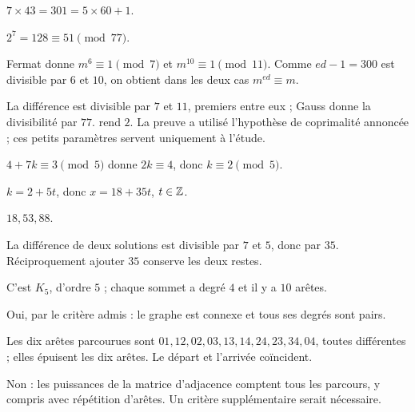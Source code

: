 \par\addvspace{6mm}\label{projet-cor-4}
\begin{questions}
\item $7\times43=301=5\times60+1$.
\item $2^7=128\equiv51\pmod{77}$.
\item Fermat donne $m^6\equiv1\pmod7$ et $m^{10}\equiv1\pmod{11}$. Comme $ed-1=300$ est divisible par $6$ et $10$, on obtient dans les deux cas $m^{ed}\equiv m$.
\item La différence est divisible par $7$ et $11$, premiers entre eux ; Gauss donne la divisibilité par $77$.  rend $2$. La preuve a utilisé l’hypothèse de coprimalité annoncée ; ces petits paramètres servent uniquement à l’étude.
\end{questions}
\par\addvspace{6mm}\label{projet-cor-5}
\begin{questions}
\item $4+7k\equiv3\pmod5$ donne $2k\equiv4$, donc $k\equiv2\pmod5$.
\item $k=2+5t$, donc $x=18+35t$, $t\in\mathbb{Z}$.
\item $18,53,88$.
\item La différence de deux solutions est divisible par $7$ et $5$, donc par $35$. Réciproquement ajouter $35$ conserve les deux restes.
\end{questions}
\par\addvspace{6mm}\label{projet-cor-6}
\begin{questions}
\item C’est $K_5$, d’ordre $5$ ; chaque sommet a degré $4$ et il y a $10$ arêtes.
\item Oui, par le critère admis : le graphe est connexe et tous ses degrés sont pairs.
\item Les dix arêtes parcourues sont $01,12,02,03,13,14,24,23,34,04$, toutes différentes ; elles épuisent les dix arêtes. Le départ et l’arrivée coïncident.
\item Non : les puissances de la matrice d’adjacence comptent tous les parcours, y compris avec répétition d’arêtes. Un critère supplémentaire serait nécessaire.
\end{questions}
